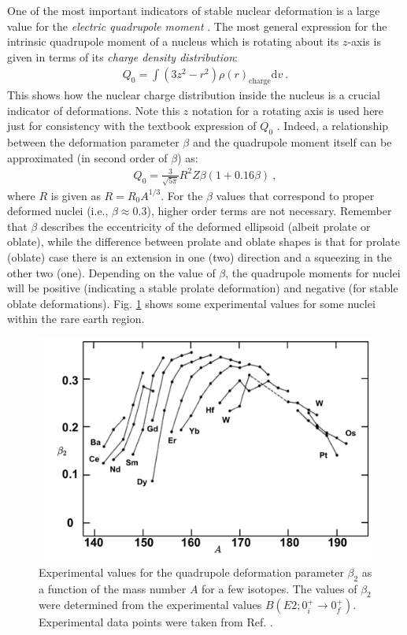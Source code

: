 One of the most important indicators of stable nuclear deformation is a large value for the \emph{electric quadrupole moment} \cite{hamamoto2016interplay}. The most general expression for the intrinsic quadrupole moment of a nucleus which is rotating about its $z$-axis is given in terms of its \emph{charge density distribution}:
\begin{align}
    Q_0=\int(3z^2-r^2)\rho(r)_\text{charge}\text{d}v\ .
\end{align}
This shows how the nuclear charge distribution inside the nucleus is a crucial indicator of deformations. Note this $z$ notation for a rotating axis is used here just for consistency with the textbook expression of $Q_0$ \cite{casten2000nuclear}. Indeed, a relationship between the deformation parameter $\beta$ and the quadrupole moment itself can be approximated (in second order of $\beta$) as:
\begin{align}
    Q_0=\frac{3}{\sqrt{5\pi}}R^2Z\beta(1+0.16\beta)\ ,
\end{align}
where $R$ is given as $R=R_0A^{1/3}$. For the $\beta$ values that correspond to proper deformed nuclei (i.e., $\beta\approx 0.3$), higher order terms are not necessary. Remember that $\beta$ describes the eccentricity of the deformed ellipsoid (albeit prolate or oblate), while the difference between prolate and oblate shapes is that for prolate (oblate) case there is an extension in one (two) direction and a squeezing in the other two (one). Depending on the value of $\beta$, the quadrupole moments for nuclei will be positive (indicating a stable prolate deformation) and negative (for stable oblate deformations). Fig. \ref{fig-quadrupole-beta-nuclides} shows some experimental values for some nuclei within the rare earth region.
\begin{figure}
    \centering
    \includegraphics[scale=0.55]{Chapters/Figures/quadrupole_Deformation_rareEarth.pdf}
    \caption{Experimental values for the quadrupole deformation parameter $\beta_2$ as a function of the mass number $A$ for a few isotopes. The values of $\beta_2$ were determined from the experimental values $B(E2;0_i^+\to 0_f^+)$. Experimental data points were taken from Ref. \cite{krane1991introductory}.}
    \label{fig-quadrupole-beta-nuclides}
\end{figure}

